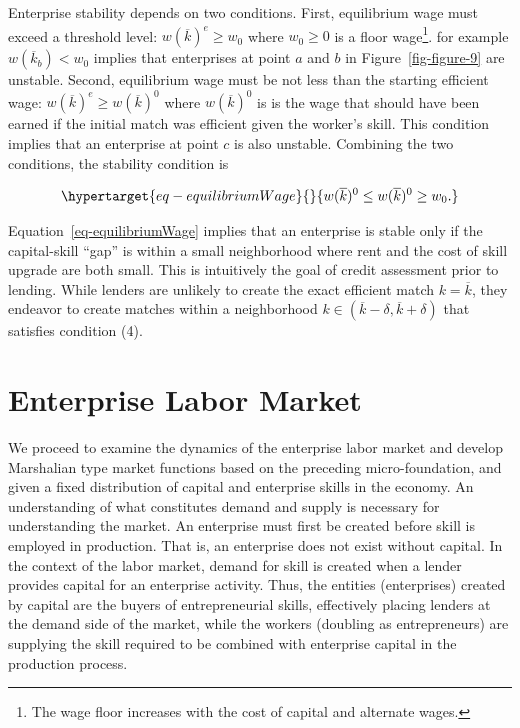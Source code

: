 \documentclass[
  a4paper,
  DIV=11,
  numbers=noendperiod]{scrartcl}
\begin{document}
Enterprise stability depends on two conditions. First, equilibrium wage
must exceed a threshold level: \(w(\overline{k})^e \ge w_0\) where
\(w_0\ge0\) is a floor wage\footnote{The wage floor increases with the
  cost of capital and alternate wages.}. for example
\(w(\overline{k}_b)<w_0\) implies that enterprises at point \(a\) and
\(b\) in Figure~\ref{fig-figure-9} are unstable. Second, equilibrium
wage must be not less than the starting efficient wage:
\(w(\overline{k})^e \ge w(\overline{k})^0\) where \(w(\overline{k})^0\)
is is the wage that should have been earned if the initial match was
efficient given the worker's skill. This condition implies that an
enterprise at point \(c\) is also unstable. Combining the two
conditions, the stability condition is

\begin{equation}\protect\hypertarget{eq-equilibriumWage}{}{
w(\overline{k})^0 \le w(\overline{k})^0 \ge w_0.
}\label{eq-equilibriumWage}\end{equation}

Equation~\ref{eq-equilibriumWage} implies that an enterprise is stable
only if the capital-skill ``gap'' is within a small neighborhood where
rent and the cost of skill upgrade are both small. This is intuitively
the goal of credit assessment prior to lending. While lenders are
unlikely to create the exact efficient match \(k=\overline{k}\), they
endeavor to create matches within a neighborhood
\(k \in (\overline{k} -\delta, \overline{k} +\delta)\) that satisfies
condition (4).

\hypertarget{enterprise-labor-market}{%
\section{Enterprise Labor Market}\label{enterprise-labor-market}}

We proceed to examine the dynamics of the enterprise labor market and
develop Marshalian type market functions based on the preceding
micro-foundation, and given a fixed distribution of capital and
enterprise skills in the economy. An understanding of what constitutes
demand and supply is necessary for understanding the market. An
enterprise must first be created before skill is employed in production.
That is, an enterprise does not exist without capital. In the context of
the labor market, demand for skill is created when a lender provides
capital for an enterprise activity. Thus, the entities (enterprises)
created by capital are the buyers of entrepreneurial skills, effectively
placing lenders at the demand side of the market, while the workers
(doubling as entrepreneurs) are supplying the skill required to be
combined with enterprise capital in the production process.
\end{document}
